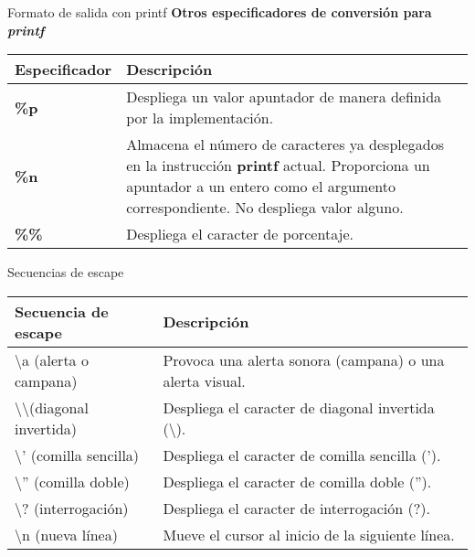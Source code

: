 \begin{frame}[t]{Formato de salida con printf}
\textbf{Otros especificadores de conversi\'on para \textit{printf}}\\ \vspace{5mm}
\scriptsize
\begin{center}
\begin{tabular}{lp{7.5cm}}
	\toprule
	\textbf{Especificador} & \textbf{Descripción}\\
	\midrule
	\textbf{\%p} & Despliega un valor apuntador de manera definida por la implementación.\\ 
	\textbf{\%n} & Almacena el número de caracteres ya desplegados en la instrucci\'on \textbf{printf} actual. Proporciona un apuntador a un entero como el argumento correspondiente. No despliega valor alguno.\\ 
	\textbf{\%\%} & Despliega el caracter de porcentaje.\\
	\bottomrule
\end{tabular}
\end{center}
\end{frame}

\begin{frame}[t]{Secuencias de escape}
\small
\begin{center}
\begin{tabular}{p{3.5cm}p{6.5cm}}
	\toprule
	\textbf{Secuencia de escape} & \textbf{Descripción}\\
	\midrule
	\textbackslash a (alerta o campana) & Provoca una alerta sonora (campana) o una alerta visual.\\
	\textbackslash \textbackslash (diagonal invertida) & Despliega el caracter de diagonal invertida (\textbackslash).\\
	\textbackslash ' (comilla sencilla) & Despliega el caracter de comilla sencilla (').
	\\
	\textbackslash '' (comilla doble) & Despliega el caracter de comilla doble (''). \\ 
	\textbackslash ? (interrogación) & Despliega el caracter de interrogación (?).\\
	\textbackslash n (nueva línea) & Mueve el cursor al inicio de la siguiente línea.\\
	\bottomrule
\end{tabular}
\end{center}
\end{frame}

